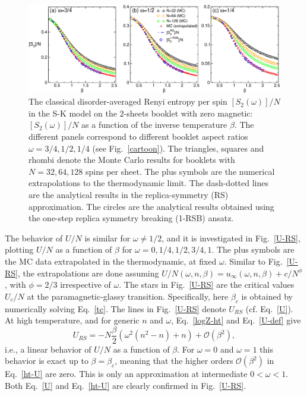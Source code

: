 \documentclass[twocolumn,superscriptaddress,prb,10pt]{revtex4-1}
\begin{document}
\begin{figure}[t]
\includegraphics*[width=0.93\linewidth]{./draft_figs/Renyi_MC_v2}
\caption{ The classical disorder-averaged Renyi entropy per spin $[S_2(\omega)]/N$  
 in the S-K model on the $2$-sheets booklet with zero magnetic: $[S_2(\omega)]/N$ as a 
 function of the inverse temperature $\beta$. The different panels 
 correspond to different booklet aspect ratios $\omega=3/4,1/2,1/4$ (see Fig.~\ref{cartoon}). 
 The triangles, squares and rhombi denote the Monte Carlo results for 
 booklets with $N=32,64,128$ spins per sheet. The plus symbols are the numerical 
 extrapolations to the thermodynamic limit. The dash-dotted lines are the  
 analytical results in the replica-symmetry (RS) approximation. 
 The circles are the analytical results obtained 
 using the one-step replica symmetry breaking (1-RSB) ansatz.
}
\label{Renyi-MC}
\end{figure}

The behavior of $U/N$ is similar for $\omega\ne1/2$, and it is investigated in Fig.~\ref{U-RS},
plotting $U/N$ as a function of $\beta$ for $\omega=0,1/4,1/2,3/4,1$. The plus symbols 
are the MC data extrapolated in the thermodynamic, at fixed $\omega$. Similar to Fig.~\ref{U-RS}, 
the extrapolations are done assuming $U/N(\omega,n,\beta)=u_{\infty}(\omega,n,\beta)+
c/N^{\phi}$, with $\phi=2/3$ irrespective of $\omega$. The stars in Fig.~\ref{U-RS} are 
the critical values $U_c/N$ at the paramagnetic-glassy transition. Specifically, here  
$\beta_c$ is obtained by numerically solving Eq.~\eqref{tc}. The lines in Fig.~\ref{U-RS} 
denote $U_{RS}$ (cf. Eq.~\eqref{U}). 
At high temperature, and for generic $n$ and $\omega$, Eq.~\eqref{logZ-ht} and Eq.~\eqref{U-def} 
give  
%
\begin{equation}
U_{RS}= -N\frac{\beta}{2}(\omega^2(n^2-n)+n)+{\mathcal O}(\beta^2), 
\label{ht-U}
\end{equation}
%
i.e., a linear behavior of $U/N$ as a function of $\beta$. For $\omega=0$ and $\omega=1$ 
this behavior is exact up to $\beta=\beta_c$, meaning that the higher orders ${\mathcal O}(\beta^2)$ 
in Eq.~\eqref{ht-U} are zero. This is only an approximation at intermediate $0<\omega<1$. 
Both Eq.~\eqref{U} and Eq.~\eqref{ht-U} are clearly confirmed in Fig.~\ref{U-RS}. 
\end{document}
